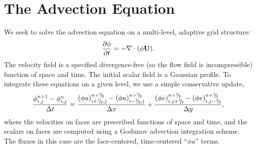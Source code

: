 \section{The Advection Equation}
We seek to solve the advection equation on a multi-level, adaptive grid structure:
\begin{equation}
\frac{\partial\phi}{\partial t} = -\nabla\cdot(\phi{\bf U}).
\end{equation}
The velocity field is a specified divergence-free (so the flow field is incompressible)
function of space and time.  The initial scalar field is a
Gaussian profile.  To integrate these equations on a given level, we use a simple conservative update,
\begin{equation}
\frac{\phi_{i,j}^{n+1}-\phi_{i,j}^n}{\Delta t} = \frac{(\phi u)_{i+\myhalf,j}^{n+\myhalf}-(\phi u)_{i-\myhalf,j}^{n+\myhalf}}{\Delta x} + \frac{(\phi v)_{i,j+\myhalf}^{n+\myhalf} - (\phi v)_{i,j-\myhalf}^{n+\myhalf}}{\Delta y},
\end{equation}
where the velocities on faces are prescribed functions of space and time, and the scalars on faces
are computed using a Godunov advection integration scheme.  The fluxes in this case are the face-centered,
time-centered ``$\phi u$'' terms.


